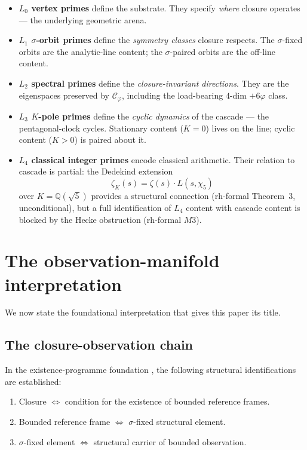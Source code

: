 \documentclass[11pt,a4paper]{article}
\theoremstyle{definition}
\theoremstyle{remark}
\begin{document}
\begin{itemize}\itemsep0pt
  \item \textbf{$L_0$ vertex primes} define the substrate. They specify \emph{where} closure operates --- the underlying geometric arena.
  \item \textbf{$L_1$ $\sigma$-orbit primes} define the \emph{symmetry classes} closure respects. The $\sigma$-fixed orbits are the analytic-line content; the $\sigma$-paired orbits are the off-line content.
  \item \textbf{$L_2$ spectral primes} define the \emph{closure-invariant directions}. They are the eigenspaces preserved by $\mathcal{C}_\varphi$, including the load-bearing $4$-dim $+6\varphi$ class.
  \item \textbf{$L_3$ $K$-pole primes} define the \emph{cyclic dynamics} of the cascade --- the pentagonal-clock cycles. Stationary content ($K=0$) lives on the line; cyclic content ($K>0$) is paired about it.
  \item \textbf{$L_4$ classical integer primes} encode classical arithmetic. Their relation to cascade is partial: the Dedekind extension
    \[
    \zeta_K(s) = \zeta(s) \cdot L(s, \chi_5)
    \]
    over $K = \mathbb{Q}(\sqrt{5})$ provides a structural connection (rh-formal Theorem~$3$, unconditional), but a full identification of $L_4$ content with cascade content is blocked by the Hecke obstruction (rh-formal $M3$).
\end{itemize}

\section{The observation-manifold interpretation}\label{sec:observation}

We now state the foundational interpretation that gives this paper its
title.

\subsection{The closure-observation chain}

In the existence-programme foundation \cite{SmartExistenceClosure}, the
following structural identifications are established:

\begin{enumerate}\itemsep0pt
  \item Closure $\iff$ condition for the existence of bounded reference frames.
  \item Bounded reference frame $\iff$ $\sigma$-fixed structural element.
  \item $\sigma$-fixed element $\iff$ structural carrier of bounded observation.
\end{enumerate}
\end{document}
